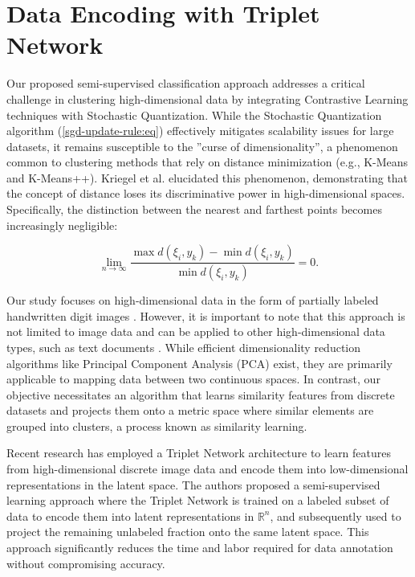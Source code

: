 \section{Data Encoding with Triplet Network}

Our proposed semi-supervised classification approach addresses a critical challenge in clustering high-dimensional data by integrating Contrastive Learning techniques \cite{Hoffer_2015,Khosla_2020} with Stochastic Quantization. While the Stochastic Quantization algorithm (\ref{sgd-update-rule:eq}) effectively mitigates scalability issues for large datasets, it remains susceptible to the ''curse of dimensionality'', a phenomenon common to clustering methods that rely on distance minimization (e.g., K-Means and K-Means++). Kriegel et al. \cite{Kriegel_Kröger_Zimek_2009} elucidated this phenomenon, demonstrating that the concept of distance loses its discriminative power in high-dimensional spaces. Specifically, the distinction between the nearest and farthest points becomes increasingly negligible:

\begin{equation}
    \label{dimensions-precision-ratio:eq}
    \lim_{n \to \infty} \frac{\max d(\xi_i, y_k) - \min d(\xi_i, y_k)}{\min d(\xi_i, y_k)} = 0.
\end{equation}

Our study focuses on high-dimensional data in the form of partially labeled handwritten digit images \cite{lecun2010mnist}. However, it is important to note that this approach is not limited to image data and can be applied to other high-dimensional data types, such as text documents \cite{Radomirovic_2023,Widodo_2011}. While efficient dimensionality reduction algorithms like Principal Component Analysis (PCA) \cite{Abdi_Williams_2010,Deisenroth_Faisal_Ong_2020} exist, they are primarily applicable to mapping data between two continuous spaces. In contrast, our objective necessitates an algorithm that learns similarity features from discrete datasets and projects them onto a metric space where similar elements are grouped into clusters, a process known as similarity learning.

Recent research \cite{MURASAKI_ANDO_SHIMAMURA_2022,Turpault_Serizel_Vincent_2019} has employed a Triplet Network architecture to learn features from high-dimensional discrete image data and encode them into low-dimensional representations in the latent space. The authors proposed a semi-supervised learning approach where the Triplet Network is trained on a labeled subset of data to encode them into latent representations in $\mathbb{R}^n$, and subsequently used to project the remaining unlabeled fraction onto the same latent space. This approach significantly reduces the time and labor required for data annotation without compromising accuracy.

